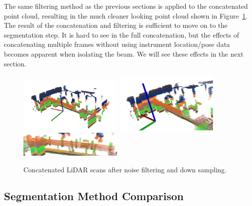 \documentclass[12pt]{drexelthesis}
\let\Oldsubsection\subsection
\renewcommand{\subsection}{\FloatBarrier\Oldsubsection}
\begin{document}
The same filtering method as the previous sections is applied to the concatenated point cloud, resulting in the much cleaner looking point cloud shown in Figure~\ref{lidarresults:filtered}. The result of the concatenation and filtering is sufficient to move on to the segmentation step. It is hard to see in the full concatenation, but the effects of concatenating multiple frames without using instrument location/pose data becomes apparent when isolating the beam. We will see these effects in the next section.

\begin{figure}[!ht]
	\centering
		\includegraphics[width=2in]{images/real-lab-scans/filtered0.png}
		\includegraphics[width=2in]{images/real-lab-scans/filtered1.png}
		\includegraphics[width=2in]{images/real-lab-scans/filtered2.png}
		\caption[Concatenated LiDAR scans after noise filtering and down sampling]{\centering Concatenated LiDAR scans after noise filtering and down sampling.}
	\label{lidarresults:filtered}
\end{figure}

\subsection{Segmentation Method Comparison}
\end{document}
